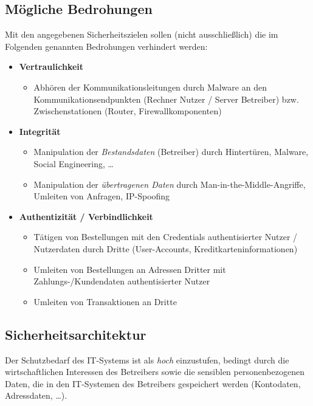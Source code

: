 \subsection{Mögliche Bedrohungen}

Mit den angegebenen Sicherheitszielen sollen (nicht ausschließlich) die im Folgenden genannten Bedrohungen verhindert werden:

\begin{itemize}
    \itemsep0.5em
    \item \textbf{Vertraulichkeit}
    \begin{itemize}
        \item Abhören der Kommunikationsleitungen durch Malware an den Kommunikationsendpunkten (Rechner Nutzer / Server Betreiber) bzw. Zwischenstationen (Router, Firewallkomponenten)
    \end{itemize}
    \item \textbf{Integrität}
    \begin{itemize}
        \item Manipulation der \textit{Bestandsdaten} (Betreiber) durch Hintertüren, Malware, Social Engineering, \ldots
        \item Manipulation der \textit{übertragenen Daten} durch Man-in-the-Middle-Angriffe, Umleiten von Anfragen, IP-Spoofing
    \end{itemize}
    \item \textbf{Authentizität / Verbindlichkeit}
    \begin{itemize}
        \item Tätigen von Bestellungen mit den Credentials authentisierter Nutzer / Nutzerdaten durch Dritte (User-Accounts, Kreditkarteninformationen)
        \item Umleiten von Bestellungen an Adressen Dritter mit Zahlungs-/Kundendaten authentisierter Nutzer
        \item Umleiten von Transaktionen an Dritte
    \end{itemize}
\end{itemize}

\subsection{Sicherheitsarchitektur}

Der Schutzbedarf des IT-Systems ist als \textit{hoch} einzustufen, bedingt durch die wirtschaftlichen Interessen des Betreibers sowie die sensiblen personenbezogenen Daten, die in den IT-Systemen des Betreibers gespeichert werden (Kontodaten, Adressdaten, \ldots).\\

